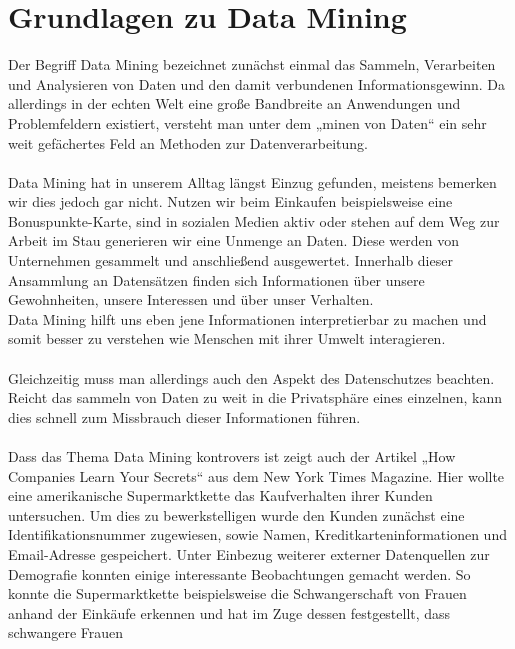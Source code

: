 %
\chapter{Grundlagen zu Data Mining}
\label{sec:intro}


Der Begriff Data Mining bezeichnet zunächst einmal das Sammeln, Verarbeiten und
Analysieren von Daten und den damit verbundenen Informationsgewinn. Da
allerdings in der echten Welt eine große Bandbreite an Anwendungen und
Problemfeldern existiert, versteht man unter dem „minen von Daten“ ein sehr
weit gefächertes Feld an Methoden zur Datenverarbeitung. \\
\\
Data Mining hat in unserem Alltag längst Einzug gefunden, meistens bemerken wir
dies jedoch gar nicht. Nutzen wir beim Einkaufen beispielsweise eine
Bonuspunkte-Karte, sind in sozialen Medien aktiv oder stehen auf dem Weg zur
Arbeit im Stau generieren wir eine Unmenge an Daten. Diese werden von
Unternehmen gesammelt und anschließend ausgewertet. Innerhalb dieser Ansammlung
an Datensätzen finden sich Informationen über unsere Gewohnheiten, unsere
Interessen und über unser Verhalten. \\
Data Mining hilft uns eben jene Informationen interpretierbar zu machen und
somit besser zu verstehen wie Menschen mit ihrer Umwelt interagieren. \\
\\
Gleichzeitig muss man allerdings auch den Aspekt des Datenschutzes beachten.
Reicht das sammeln von Daten zu weit in die Privatsphäre eines einzelnen,
kann dies schnell zum Missbrauch dieser Informationen führen. \\
\\
Dass das Thema Data Mining kontrovers ist zeigt auch der Artikel „How
Companies Learn Your Secrets“ aus dem New York Times Magazine. Hier wollte
eine amerikanische Supermarktkette das Kaufverhalten ihrer Kunden untersuchen.
Um dies zu bewerkstelligen wurde den Kunden zunächst eine Identifikationsnummer
zugewiesen, sowie Namen, Kreditkarteninformationen und Email-Adresse
gespeichert. Unter Einbezug weiterer externer Datenquellen zur Demografie
konnten einige interessante Beobachtungen gemacht werden. So konnte die
Supermarktkette beispielsweise die Schwangerschaft von Frauen anhand der
Einkäufe erkennen und hat im Zuge dessen festgestellt, dass schwangere Frauen
